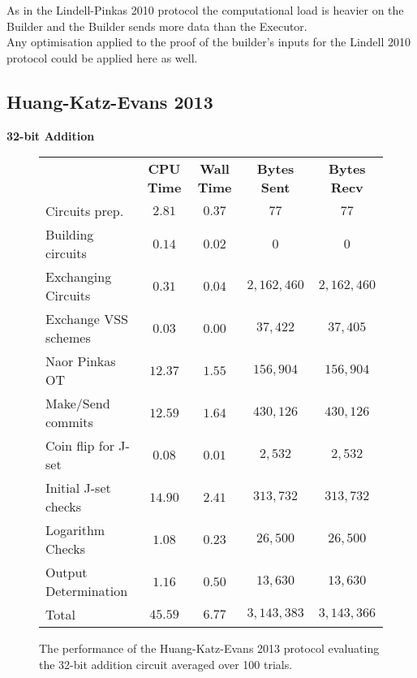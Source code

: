 \documentclass[ %
                    author={Nicholas Tutte},
                supervisor={Prof. Nigel Smart},
                    degree={MEng},
                     title={Secure Two Party Computation},
                  subtitle={A practical comparison of recent protocols},
                      type={Research - GG1K},
                      year={2015} ]{dissertation}
\begin{document}
					As in the Lindell-Pinkas 2010 protocol the computational load is heavier on the Builder and the Builder sends more data than the Executor.\\

					Any optimisation applied to the proof of the builder's inputs for the Lindell 2010 protocol could be applied here as well.

			\subsection{Huang-Katz-Evans 2013}

				\FloatBarrier
				\noindent \textbf{32-bit Addition}
				\begin{figure}[!ht]
					\begin{tabular}{| p{4.3cm} | c c c c |}
						\hline
						 & \textbf{CPU Time} & \textbf{Wall Time} & \textbf{Bytes Sent} & \textbf{Bytes Recv} \\
						\thickhline
						Circuits prep. & $2.81$ & $0.37$ & $77$ & $77$ \\
						\hline
						Building circuits & $0.14$ & $0.02$ & $0$ & $0$ \\
						\hline
						Exchanging Circuits & $0.31$ & $0.04$ & $2,162,460$ & $2,162,460$ \\
						\hline
						Exchange VSS schemes & $0.03$ & $0.00$ & $37,422$ & $37,405$ \\
						\hline
						Naor Pinkas OT & $12.37$ & $1.55$ & $156,904$ & $156,904$ \\
						\hline
						Make/Send commits & $12.59$ & $1.64$ & $430,126$ & $430,126$ \\
						\hline
						Coin flip for J-set & $0.08$ & $0.01$ & $2,532$ & $2,532$ \\
						\hline
						Initial J-set checks & $14.90$ & $2.41$ & $313,732$ & $313,732$ \\
						\hline
						Logarithm Checks & $1.08$ & $0.23$ & $26,500$ & $26,500$ \\
						\hline
						Output Determination & $1.16$ & $0.50$ & $13,630$ & $13,630$ \\
						\thickhline
						Total & $45.59$ & $6.77$ & $3,143,383$ & $3,143,366$ \\
						\hline
					\end{tabular}
					\caption{The performance of the Huang-Katz-Evans 2013 protocol evaluating the 32-bit addition circuit averaged over 100 trials.\label{table:HKE_2013_Add}}
				\end{figure}
\end{document}

